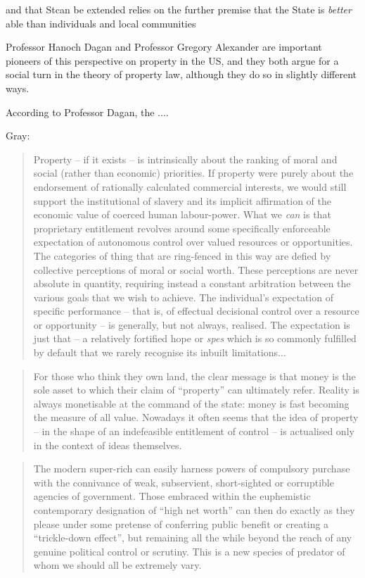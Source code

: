  


  and that Stcan be extended relies on the further premise that the State is {\it better} able than individuals and local communities 

Professor Hanoch Dagan and Professor Gregory Alexander are important pioneers of this perspective on property in the US, and they both argue for a social turn in the theory of property law, although they do so in slightly different ways.

According to Professor Dagan, the ....

Gray:

\begin{quote}
Property -- if it exists -- is intrinsically about the ranking of moral and social (rather than economic) priorities. If property were purely about the endorsement of rationally calculated commercial interests, we would still support the institutional of slavery and its implicit affirmation of the economic value of coerced human labour-power. What we {\it can} is that proprietary entitlement revolves around some specifically enforceable expectation of autonomous control over valued resources or opportunities. The categories of thing that are ring-fenced in this way are defied by collective perceptions of moral or social worth. These perceptions are never absolute in quantity, requiring instead a constant arbitration between the various goals that we wish to achieve. The individual's expectation of specific performance -- that is, of effectual decisional control over a resource or opportunity -- is generally, but not always, realised. The expectation is just that -- a relatively fortified hope or {\it spes} which is so commonly fulfilled by default that we rarely recognise its inbuilt limitations...
\end{quote}

\begin{quote}
For those who think they own land, the clear message is that money is the sole asset to which their claim of ``property'' can ultimately refer. Reality is always monetisable at the command of the state: money is fast becoming the measure of all value. Nowadays it often seems that the idea of property -- in the shape of an indefeasible entitlement of control -- is actualised only in the context of ideas themselves.
\end{quote}

\begin{quote}
The modern super-rich can easily harness powers of compulsory purchase with the connivance of weak, subservient, short-sighted or corruptible agencies of government. Those embraced within the euphemistic contemporary designation of ``high net worth'' can then do exactly as they please under some pretense of conferring public benefit or creating a ``trickle-down effect'', but remaining all the while beyond the reach of any genuine political control or scrutiny. This is a new species of predator of whom we should all be extremely vary.
\end{quote}

